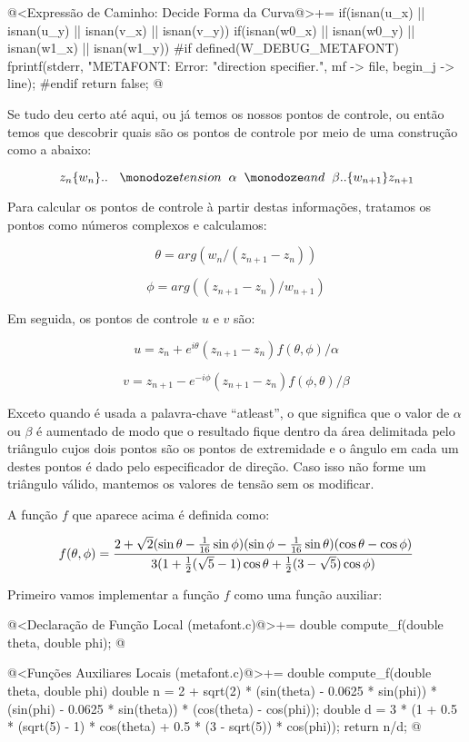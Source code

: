 {\iniciocodigo
@<Expressão de Caminho: Decide Forma da Curva@>+=
if(isnan(u_x) || isnan(u_y) || isnan(v_x) ||  isnan(v_y)){
  if(isnan(w0_x) || isnan(w0_y) || isnan(w1_x) || isnan(w1_y)){
#if defined(W_DEBUG_METAFONT)
    fprintf(stderr, "METAFONT: Error: %
                    "direction specifier.\n",  mf -> file, begin_j -> line);
#endif
    return false;
  }
}
@
\fimcodigo

Se tudo deu certo até aqui, ou já temos os nossos pontos de controle,
ou então temos que descobrir quais são os pontos de controle por meio
de uma construção como a abaixo:

$$
z_n\{w_n\}..\ {\hskip2mm \monoespaco{tension}\hskip2mm } \alpha {\hskip2mm \monoespaco{and}\hskip2mm } \beta .. \{w_{n+1}\}z_{n+1}
$$

Para calcular os pontos de controle à partir destas informações,
tratamos os pontos como números complexos e calculamos:

$$
\theta = arg(w_n/(z_{n+1}-z_n))
$$

$$
\phi = arg((z_{n+1}-z_n)/w_{n+1})
$$

Em seguida, os pontos de controle $u$ e $v$ são:

$$
u = z_{n} + e^{i\theta}(z_{n+1}-z_n)f(\theta, \phi)/\alpha
$$

$$
v = z_{n+1} - e^{-i\phi}(z_{n+1}-z_n)f(\phi, \theta)/\beta
$$

Exceto quando é usada a palavra-chave ``atleast'', o que significa que
o valor de $\alpha$ ou $\beta$ é aumentado de modo que o resultado
fique dentro da área delimitada pelo triângulo cujos dois pontos são
os pontos de extremidade e o ângulo em cada um destes pontos é dado
pelo especificador de direção. Caso isso não forme um triângulo
válido, mantemos os valores de tensão sem os modificar.

A função $f$ que aparece acima é definida como:

$$
f(\theta, \phi) = {{2+\sqrt{2}(\sin\theta-{{1}\over{16}}\sin\phi)(\sin\phi-{{1}\over{16}}\sin\theta)(\cos\theta-\cos\phi)}\over{3(1+{1\over 2}(\sqrt 5 - 1)\cos\theta+{1\over 2}(3-\sqrt 5)\cos\phi)}}
$$

Primeiro vamos implementar a função $f$ como uma função auxiliar:

\iniciocodigo
@<Declaração de Função Local (metafont.c)@>+=
double compute_f(double theta, double phi);
@
\fimcodigo

\iniciocodigo
@<Funções Auxiliares Locais (metafont.c)@>+=
double compute_f(double theta, double phi){
  double n = 2 + sqrt(2) * (sin(theta) - 0.0625 * sin(phi)) *
             (sin(phi) - 0.0625 * sin(theta)) * (cos(theta) - cos(phi));
  double d = 3 * (1 + 0.5 * (sqrt(5) - 1) * cos(theta) + 0.5 * (3 - sqrt(5)) *
                  cos(phi));
  return n/d;
}
@
\fimcodigo

}

